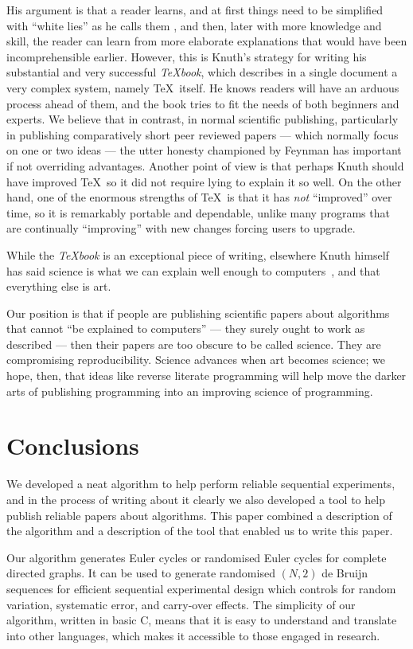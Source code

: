 \documentclass[12pt]{article}
\begin{document}
His argument is that a reader learns, and at first things need to be simplified with ``white lies'' as he calls them \cite[p44]{texbook}, and then, later with more knowledge and skill, the reader can learn from more elaborate explanations that would have been incomprehensible earlier. However, this is Knuth's strategy for writing his substantial and very successful \emph{\TeX book}, which describes in a single document a very complex system, namely \TeX\ itself. He knows readers will have an arduous process ahead of them, and the book tries to fit the needs of both beginners and experts. We believe that in contrast, in normal scientific publishing, particularly in publishing comparatively short peer reviewed papers --- which normally focus on one or two ideas --- the utter honesty championed by Feynman has important if not overriding advantages. Another point of view is that perhaps Knuth should have improved \TeX\ so it did not require lying to explain it so well. On the other hand, one of the enormous strengths of \TeX\ is that it has \emph{not\/} ``improved'' over time, so it is remarkably portable and dependable, unlike many programs that are continually ``improving'' with new changes forcing users to upgrade.

While the \emph{\TeX book} is an exceptional piece of writing, elsewhere Knuth himself has said science is what we can explain well enough to computers~\cite{a=b}, and that everything else is art. 

Our position is that if people are publishing scientific papers about algorithms that cannot ``be explained to computers'' --- they surely ought to work as described --- then their papers are too obscure to be called science. They are compromising reproducibility. Science advances when art becomes science; we hope, then, that ideas like reverse literate programming will help move the darker arts of publishing programming into an improving science of programming.

\section{Conclusions}\label{conclusions}
We developed a neat algorithm to help perform reliable sequential experiments, and in the process of writing about it clearly we also developed a tool to help publish reliable papers about algorithms. This paper combined a description of the algorithm and a description of the tool that enabled us to write this paper.

Our algorithm generates Euler cycles or randomised Euler cycles for complete directed graphs. It can be used to generate randomised $(N,2)$ de Bruijn sequences for efficient sequential experimental design which controls for random variation, systematic error, and carry-over effects. The simplicity of our algorithm, written in basic C, means that it is easy to understand and translate into other languages, which makes it accessible to those engaged in research. 
\end{document}
